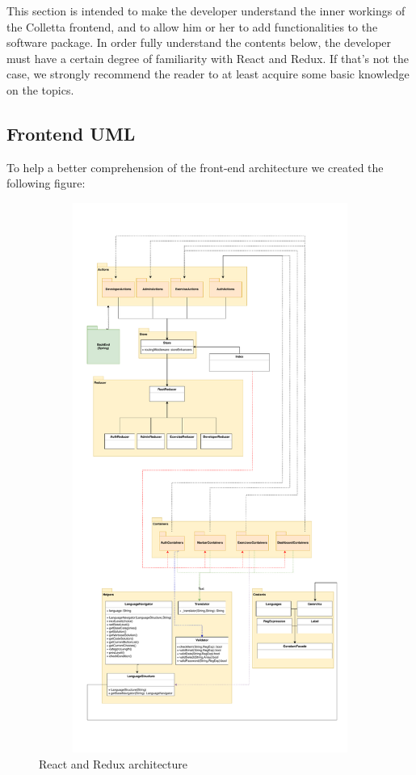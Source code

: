 This section is intended to make the developer understand the inner workings of the Colletta frontend, and to allow him or her to add functionalities to the software package.
In order fully understand the contents below, the developer must have a certain degree of familiarity with React and Redux. If that's not the case, we strongly recommend the reader to at least acquire some basic knowledge on the topics.
\subsection{Frontend UML}
To help a better comprehension of the front-end architecture we created the following figure:
\begin{figure}
\centering 
\includegraphics[width=15cm, height=18cm]{uml/reactredux.pdf} 
\caption{React and Redux architecture}
\end{figure}
